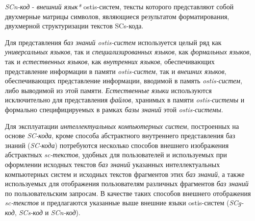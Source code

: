 \textit{SCn-код} - \textit{внешний язык*} ostis-систем, тексты которого представляют собой двухмерные матрицы символов, являющиеся результатом форматирования, двухмерной структуризации текстов SCs-кода.

\begin{SCn}

    \begin{scnindent}
    \end{scnindent}

\end{SCn}

Для представления \textit{баз знаний ostis-систем} используется целый ряд как \textit{универсальных языков}, так и \textit{специализированных языков}, как \textit{формальных языков}, так и \textit{естественных языков}, как \textit{внутренних языков}, обеспечивающих представление информации в памяти \textit{ostis-систем}, так и \textit{внешних языков}, обеспечивающих представление информации, вводимой в память \textit{ostis-систем}, либо выводимой из этой памяти. \textit{Естественные языки} используются исключительно для представления \textit{файлов}, хранимых в памяти \textit{ostis-системы} и формально специфицируемых в рамках \textit{базы знаний} этой \textit{ostis-системы}.

Для эксплуатации \textit{интеллектуальных компьютерных систем}, построенных на основе \textit{SC-кода}, кроме способа абстрактного внутреннего представления баз знаний (\textit{SC-кода}) потребуются несколько способов внешнего изображения абстрактных \textit{sc-текстов}, удобных для пользователей и используемых при оформлении исходных текстов \textit{баз знаний} указанных интеллектуальных компьютерных систем и исходных текстов фрагментов этих \textit{баз знаний}, а также используемых для отображения пользователям различных фрагментов \textit{баз знаний} по пользовательским запросам. В качестве таких способов внешнего отображения \textit{sc-текстов} и предлагаются указанные выше внешние языки ostis-систем (\textit{SCg-код}, \textit{SCs-код} и  \textit{SCn-код}).


